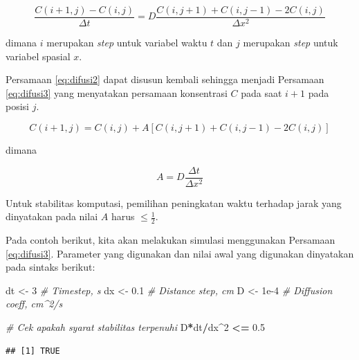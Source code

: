 \documentclass[
]{book}
\newenvironment{Shaded}{\begin{snugshade}}{\end{snugshade}}
\newcommand{\CommentTok}[1]{\textcolor[rgb]{0.56,0.35,0.01}{\textit{#1}}}
\newcommand{\DecValTok}[1]{\textcolor[rgb]{0.00,0.00,0.81}{#1}}
\newcommand{\FloatTok}[1]{\textcolor[rgb]{0.00,0.00,0.81}{#1}}
\newcommand{\NormalTok}[1]{#1}
\newcommand{\OtherTok}[1]{\textcolor[rgb]{0.56,0.35,0.01}{#1}}
\newcommand{\SpecialCharTok}[1]{\textcolor[rgb]{0.81,0.36,0.00}{\textbf{#1}}}
\theoremstyle{definition}
\theoremstyle{definition}
\theoremstyle{definition}
\theoremstyle{definition}
\theoremstyle{remark}
\begin{document}
\begin{equation}
\frac{C\left(i+1,j\right)-C\left(i,j\right)}{\Delta t}=D\frac{C\left(i,j+1\right)+C\left(i,j-1\right)-2C\left(i,j\right)}{\Delta x^2}
  \label{eq:difusi2}
\end{equation}

dimana \(i\) merupakan \emph{step} untuk variabel waktu \(t\) dan \(j\) merupakan \emph{step} untuk variabel spasial \(x\).

Persamaan \eqref{eq:difusi2} dapat disusun kembali sehingga menjadi Persamaan \eqref{eq:difusi3} yang menyatakan persamaan konsentrasi \(C\) pada saat \(i+1\) pada posisi \(j\).

\begin{equation}
C\left(i+1,j\right)=C\left(i,j\right)+A\left[C\left(i,j+1\right)+C\left(i,j-1\right)-2C\left(i,j\right)\right]
  \label{eq:difusi3}
\end{equation}

dimana

\begin{equation}
A=D\frac{\Delta t}{\Delta x^2}
  \label{eq:difusi4}
\end{equation}

Untuk stabilitas komputasi, pemilihan peningkatan waktu terhadap jarak yang dinyatakan pada nilai \(A\) harus \(\le\frac{1}{2}\).

Pada contoh berikut, kita akan melakukan simulasi menggunakan Persamaan \eqref{eq:difusi3}. Parameter yang digunakan dan nilai awal yang digunakan dinyatakan pada sintaks berikut:

\begin{Shaded}
\begin{Highlighting}[]
\NormalTok{dt    }\OtherTok{\textless{}{-}} \DecValTok{3}                \CommentTok{\# Timestep, s}
\NormalTok{dx    }\OtherTok{\textless{}{-}} \FloatTok{0.1}              \CommentTok{\# Distance step, cm}
\NormalTok{D     }\OtherTok{\textless{}{-}} \FloatTok{1e{-}4}             \CommentTok{\# Diffusion coeff, cm\^{}2/s}

\CommentTok{\# Cek apakah syarat stabilitas terpenuhi}
\NormalTok{D}\SpecialCharTok{*}\NormalTok{dt}\SpecialCharTok{/}\NormalTok{dx}\SpecialCharTok{\^{}}\DecValTok{2} \SpecialCharTok{\textless{}=} \FloatTok{0.5}
\end{Highlighting}
\end{Shaded}

\begin{verbatim}
## [1] TRUE
\end{verbatim}
\end{document}
